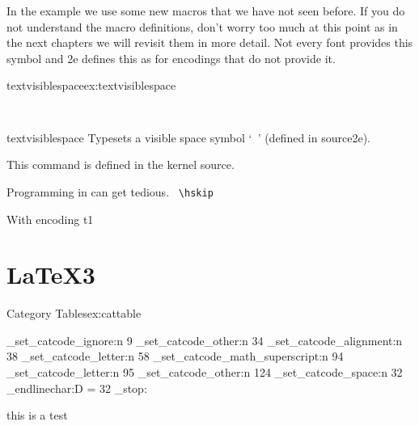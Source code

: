 In the example we use some new macros that we have not seen before. If you do not understand
the macro definitions, don't worry too much at this point as in the next chapters we will revisit
them in more detail. Not every font provides this symbol and \latex2e defines this as for encodings
that do not provide it.

\begin{texexample}{textvisiblespace}{ex:textvisiblespace}
\meaning\textvisiblespace
\makeatletter
\def\textvisiblespace{%
 \mbox{\kern.06em\vrule \@height.3ex}%
  \vbox{\hrule \@width.3em}%
  \hbox{\vrule \@height.3ex}}
\makeatother

\verb*+  +
\end{texexample}





\begin{docCommand}{textvisiblespace}{}
Typesets a visible space symbol `\verb*+ +' (defined in source2e).
\end{docCommand}

This command is defined in the kernel source. 


  
Programming in \tex can get tedious. \textvisiblespace \verb*+ \hskip+


With encoding t1

\section{LaTeX3}
\begin{texexample}{Category Tables}{ex:cattable}
\ExplSyntaxOn
\protected \gdef\ExplOn {
\char_set_catcode_ignore:n { 9 } %
\char_set_catcode_other:n { 34 } %
\char_set_catcode_alignment:n { 38 } %
\char_set_catcode_letter:n { 58 } %
\char_set_catcode_math_superscript:n { 94 } %
\char_set_catcode_letter:n { 95 } %
\char_set_catcode_other:n { 124 } %
\char_set_catcode_space:n { 32 } %
\tex_endlinechar:D = 32 \scan_stop:
}
\ExplOn
this is a test

\ExplSyntaxOff

\end{texexample}


